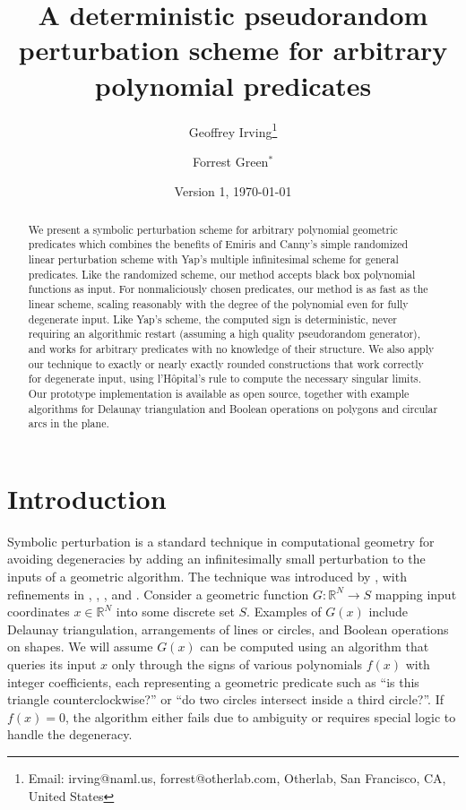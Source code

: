 \documentclass[11pt]{article}
\title{A deterministic pseudorandom perturbation scheme for arbitrary polynomial predicates}
\author{Geoffrey Irving\thanks{Email: irving@naml.us, forrest@otherlab.com, Otherlab, San Francisco, CA, United States}
\and Forrest Green$^*$}
\date{Version 1, \today}
\newcommand{\R}{\mathbb{R}}
\begin{document}
\maketitle

\begin{abstract}
We present a symbolic perturbation scheme for arbitrary polynomial geometric predicates which combines the benefits of
Emiris and Canny's simple randomized linear perturbation scheme with Yap's multiple infinitesimal scheme for general predicates.
Like the randomized scheme, our method accepts black box polynomial functions as input.  For nonmaliciously chosen predicates,
our method is as fast as the linear scheme, scaling reasonably with the degree of the polynomial even for fully
degenerate input.  Like Yap's scheme, the computed sign is deterministic, never requiring an algorithmic restart (assuming a
high quality pseudorandom generator), and works for arbitrary predicates with no knowledge of their structure.  We also apply
our technique to exactly or nearly exactly rounded constructions that work correctly for degenerate input, using l'H\^opital's
rule to compute the necessary singular limits.  Our prototype implementation is available as open source, together with example
algorithms for Delaunay triangulation and Boolean operations on polygons and circular arcs in the plane.
\end{abstract}

\section{Introduction}

Symbolic perturbation is a standard technique in computational geometry for avoiding degeneracies by
adding an infinitesimally small perturbation to the inputs of a geometric algorithm.  The technique was introduced by
\cite{edelsbrunner1990simulation}, with refinements in \cite{yap1990symbolic}, \cite{emiris1992efficient}, \cite{emiris1995general},
and \cite{seidel1998nature}.  Consider a geometric function $G : \R^N \to S$ mapping input coordinates $x \in \R^N$ into
some discrete set $S$.  Examples of $G(x)$ include Delaunay triangulation, arrangements of lines or circles, and Boolean operations
on shapes.  We will assume $G(x)$ can be computed using an algorithm that queries its input $x$ only through the
signs of various polynomials $f(x)$ with integer coefficients, each representing a geometric predicate such as
``is this triangle counterclockwise?'' or ``do two circles intersect inside a third circle?''.  If $f(x) = 0$, the algorithm
either fails due to ambiguity or requires special logic to handle the degeneracy.
\end{document}

